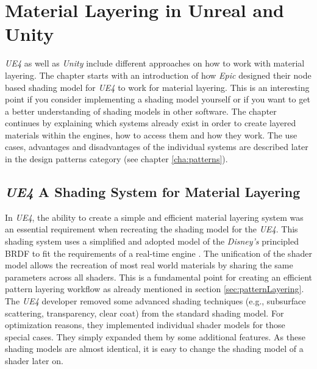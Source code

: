 \chapter{Material Layering in Unreal and Unity}\label{cha:implementationParametricLayering}

\emph{UE4} as well as \emph{Unity} include different approaches on how to work with material layering. The chapter starts with an introduction of how \emph{Epic} designed their node based shading model for \emph{UE4} to work for material layering. This is an interesting point if you consider implementing a shading model yourself or if you want to get a better understanding of shading models in other software. The chapter continues by explaining which systems already exist in order to create layered materials within the engines, how to access them and how they work. The use cases, advantages and disadvantages of the individual systems are described later in the design patterns category (see chapter \ref{cha:patterns}).  

 

\section{\emph{UE4} A Shading System for Material Layering}

In \emph{UE4}, the ability to create a simple and efficient material layering system was an essential requirement when recreating the shading model for the \emph{UE4}. This shading system uses a simplified and adopted model of the \emph{Disney's} principled BRDF \cite{burley2012physically} to fit the requirements of a real-time engine \cite[p.\,9]{karis2013real}. The unification of the shader model allows the recreation of most real world materials by sharing the same parameters across all shaders. This is a fundamental point for creating an efficient pattern layering workflow as already mentioned in section \ref{sec:patternLayering}. The \emph{UE4} developer removed some advanced shading techniques (e.g., subsurface scattering, transparency, clear coat) from the standard shading model. For optimization reasons, they implemented individual shader models for those special cases. They simply expanded them by some additional features.  As these shading models are almost identical, it is easy to change the shading model of a shader later on.

